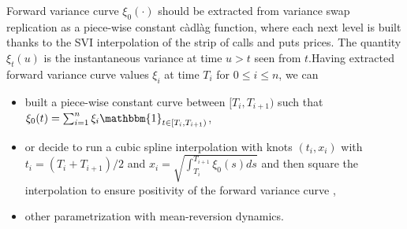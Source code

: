 Forward variance curve $\xi_0(\cdot)$ should be extracted from variance swap replication as a piece-wise constant c\`adl\`ag function, where each next level is built thanks to the SVI interpolation of the strip of calls and puts prices. The quantity $\xi_t(u)$ is the instantaneous variance at time $u > t$ seen from $t$.\newline Having extracted forward variance curve values $\xi_i$ at time $T_i$ for ${0\leq i \leq n}$, we can 
\begin{itemize}
    \item built a piece-wise constant curve between $[T_i, T_{i+1})$ such that $\xi_0(t) = \sum_{i=1}^n \xi_i \mathbbm{1}_{t \in [T_i, T_{i+1})}$, 
    \item or decide to run a cubic spline interpolation with knots $(t_i, x_i)$ with $t_i = (T_i + T_{i+1})/2$ and $x_i = \sqrt{\int_{T_i}^{T_{i+1}} \xi_0(s)ds}$ and then square the interpolation to ensure positivity of the forward variance curve \cite{jaber2022quintic},
    \item other parametrization with mean-reversion dynamics.
\end{itemize}
